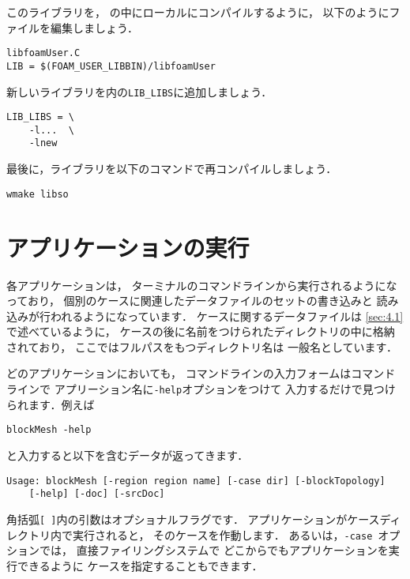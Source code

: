 このライブラリを，
の中にローカルにコンパイルするように，
以下のようにファイルを編集しましょう．
\begin{OFfile}
\begin{verbatim}
libfoamUser.C
LIB = $(FOAM_USER_LIBBIN)/libfoamUser
\end{verbatim}%
\end{OFfile}
新しいライブラリを内の\verb|LIB_LIBS|に追加しましょう．
\begin{OFfile}
\begin{verbatim}
LIB_LIBS = \
    -l...  \
    -lnew
\end{verbatim}
\end{OFfile}
最後に，ライブラリを以下のコマンドで再コンパイルしましょう．
\begin{OFterminal}
\begin{verbatim}
wmake libso
\end{verbatim}
\end{OFterminal}



\section{アプリケーションの実行}
\label{sec:3.3}
各アプリケーションは，
ターミナルのコマンドラインから実行されるようになっており，
個別のケースに関連したデータファイルのセットの書き込みと
読み込みが行われるようになっています．
ケースに関するデータファイルは
\autoref{sec:4.1}で述べているように，
ケースの後に名前をつけられたディレクトリの中に格納されており，
ここではフルパスをもつディレクトリ名は
一般名としています．

どのアプリケーションにおいても，
コマンドラインの入力フォームはコマンドラインで
アプリーション名に\verb|-help|オプションをつけて
入力するだけで見つけられます．例えば
\begin{OFterminal}
\begin{verbatim}
blockMesh -help
\end{verbatim}
\end{OFterminal}
と入力すると以下を含むデータが返ってきます．
\begin{OFterminal}
\begin{verbatim}
Usage: blockMesh [-region region name] [-case dir] [-blockTopology]
    [-help] [-doc] [-srcDoc]
\end{verbatim}
\end{OFterminal}
角括弧\texttt{[ ]}内の引数はオプショナルフラグです．
アプリケーションがケースディレクトリ内で実行されると，
そのケースを作動します．
あるいは，\texttt{-case}~オプションでは，
直接ファイリングシステムで
どこからでもアプリケーションを実行できるように
ケースを指定することもできます．

